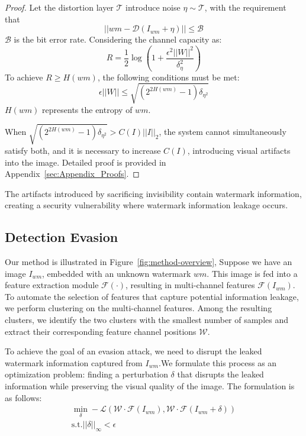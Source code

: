 \begin{proof}
Let the distortion layer $\mathcal{T}$ introduce noise $\eta \sim \mathcal{T}$, with the requirement that
$$||wm-\mathcal{D}(I_{wm} + \eta)|| \le \mathcal{B}$$
$\mathcal{B}$ is the bit error rate. Considering the channel capacity as:
$$R=\frac{1}{2}\log(1+\frac{\epsilon^2||W||^2}{\delta_{\eta}^2})$$
To achieve $R\ge H(wm)$, the following conditions must be met:
$$
\epsilon||W|| \le \sqrt{(2^{2H(wm)}-1)\delta_{\eta^2}}
$$
$H(wm)$ represents the entropy of $wm$. 

When $\sqrt{(2^{2H(wm)}-1)\delta_{\eta^2}} > C(I)||I||_2$, the system cannot simultaneously satisfy both, and it is necessary to increase $C(I)$, introducing visual artifacts into the image. Detailed proof is provided in Appendix~\ref{sec:Appendix_Proofs}.
\end{proof}
The artifacts introduced by sacrificing invisibility contain watermark information, creating a security vulnerability where watermark information leakage occurs.


\subsection{Detection Evasion}\label{sec:Method_Evasion Attack}
Our method is illustrated in Figure~\ref{fig:method-overview}, Suppose we have an image $I_{wm}$, embedded with an unknown watermark $wm$. This image is fed into a feature extraction module $\mathcal{F}(\cdot)$, resulting in multi-channel features $\mathcal{F}(I_{wm})$. To automate the selection of features that capture potential information leakage, we perform clustering on the multi-channel features. Among the resulting clusters, we identify the two clusters with the smallest number of samples and extract their corresponding feature channel positions $\mathcal{W}$.

To achieve the goal of an evasion attack, we need to disrupt the leaked watermark information captured from $I_{wm}$.We formulate this process as an optimization problem: finding a perturbation $\delta$ that disrupts the leaked information while preserving the visual quality of the image. The formulation is as follows:
\begin{equation}
\label{eq:1}
\begin{split}
    \mathop{\min}_{\delta}-\mathcal{L}(\mathcal{W} \cdot \mathcal{F}(I_{wm}), \mathcal{W}\cdot \mathcal{F}(I_{wm} + \delta)) \\
    \mathrm{ s.t.} ||\delta||_{\infty} < \epsilon
\end{split}
\end{equation}


